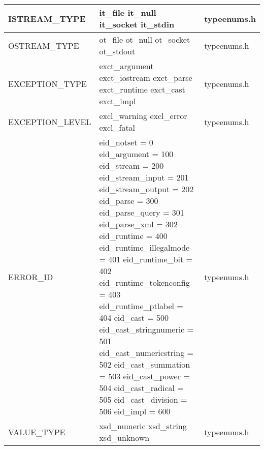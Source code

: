 \begin{tiny}
\begin{longtable}[ht]{|p{0.225\tablwidth}|p{0.375\tablwidth}|p{0.3\tablwidth}|}
  \hline ISTREAM\_TYPE & it\_file \newline it\_null \newline it\_socket \newline it\_stdin & typeenums.h \\
  \hline OSTREAM\_TYPE & ot\_file \newline ot\_null \newline ot\_socket \newline ot\_stdout & typeenums.h \\

  \newpage

  \hline EXCEPTION\_TYPE & exct\_argument \newline exct\_iostream \newline exct\_parse \newline exct\_runtime \newline exct\_cast \newline exct\_impl & typeenums.h \\
  \hline EXCEPTION\_LEVEL & excl\_warning \newline excl\_error \newline excl\_fatal & typeenums.h \\
  \hline ERROR\_ID & eid\_notset = 0 \newline eid\_argument = 100 \newline eid\_stream = 200 \newline eid\_stream\_input = 201 \newline eid\_stream\_output = 202 \newline eid\_parse = 300 \newline eid\_parse\_query = 301 \newline eid\_parse\_xml = 302 \newline eid\_runtime = 400 \newline eid\_runtime\_illegalmode = 401 \newline eid\_runtime\_bit = 402 \newline eid\_runtime\_tokenconfig = 403 \newline eid\_runtime\_ptlabel = 404 \newline eid\_cast = 500 \newline eid\_cast\_stringnumeric = 501 \newline eid\_cast\_numericstring = 502 \newline eid\_cast\_summation = 503 \newline eid\_cast\_power = 504 \newline eid\_cast\_radical = 505 \newline eid\_cast\_division = 506 \newline eid\_impl = 600 & typeenums.h \\
  \hline VALUE\_TYPE & xsd\_numeric \newline xsd\_string \newline xsd\_unknown & typeenums.h \\
  \hline
\end{longtable}
\end{tiny}

